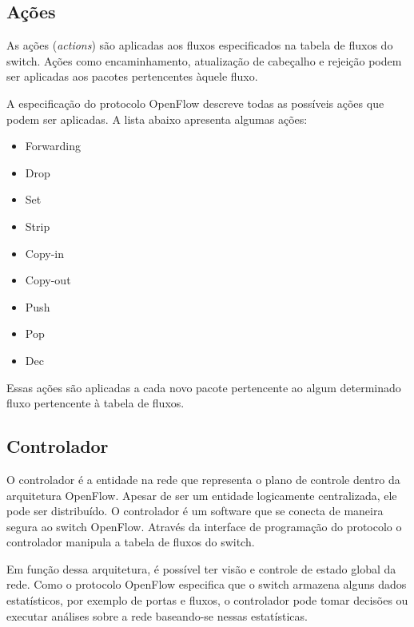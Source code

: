 \subsection{Ações}

As ações (\emph{actions}) são aplicadas aos fluxos especificados na tabela
de fluxos do switch.
Ações como encaminhamento, atualização de cabeçalho e rejeição podem ser 
aplicadas aos pacotes pertencentes àquele fluxo.

A especificação do protocolo OpenFlow \citep{ofprotocol2015} descreve todas 
as possíveis ações que podem ser aplicadas.
A lista abaixo apresenta algumas ações:

\begin{multicols}{3}
    \begin{itemize}
        \item Forwarding
        \item Drop
        \item Set
        \item Strip
        \item Copy-in
        \item Copy-out
        \item Push
        \item Pop
        \item Dec
    \end{itemize}
\end{multicols}

Essas ações são aplicadas a cada novo pacote pertencente ao algum determinado
fluxo pertencente à tabela de fluxos.

\subsection{Controlador}

O controlador é a entidade na rede que representa o plano de controle dentro
da arquitetura OpenFlow.
Apesar de ser um entidade logicamente centralizada, ele pode ser distribuído.
O controlador é um software que se conecta de maneira segura ao switch 
OpenFlow.
Através da interface de programação do protocolo o controlador manipula 
a tabela de fluxos do switch.

Em função dessa arquitetura, é possível ter visão e controle de estado global
da rede.
Como o protocolo OpenFlow especifica que o switch armazena alguns dados 
estatísticos, por exemplo de portas e fluxos, o controlador pode tomar 
decisões ou executar análises sobre a rede baseando-se nessas estatísticas.

